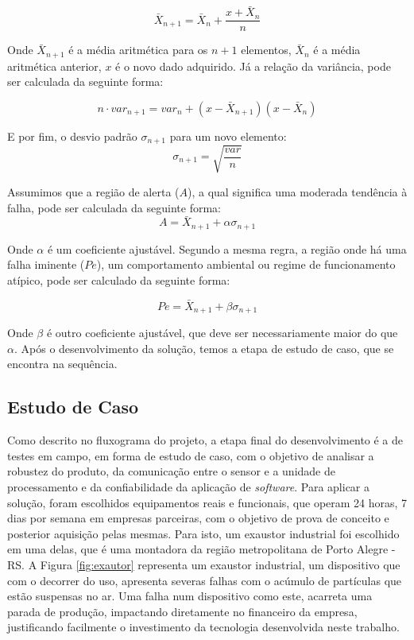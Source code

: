 \documentclass[a4paper]{ifacconf}
\begin{document}
\begin{equation}\label{eq:ml}
    \bar{X}_{n+1} = \bar{X}_{n} + \frac{x + \bar{X}_n}{n}
\end{equation}

Onde $\bar{X}_{n+1}$ é a média aritmética para os $n+1$ elementos, $ \bar{X}_{n}$ é a média aritmética anterior,
$x$ é o novo dado adquirido. Já a relação da variância, pode ser calculada da seguinte forma:


\begin{equation}\label{eq:ml2}
    n \cdot var_{n+1} = var_{n} + (x - \bar{X}_{n+1})(x-\bar{X}_n)
\end{equation}

E por fim, o desvio padrão $\sigma_{n+1}$ para um novo elemento:
\begin{equation}\label{eq:ml3}
    \sigma_{n+1} = \sqrt{\frac{var}{n}}
\end{equation}

Assumimos que a região de alerta ($A$), a qual significa uma moderada tendência à falha, pode ser calculada da seguinte forma: 
\begin{equation}\label{eq:ml4}
    A = \bar{X}_{n+1} + \alpha \sigma_{n+1} 
\end{equation}

Onde $\alpha$ é um coeficiente ajustável. Segundo a mesma regra, a região onde há uma falha iminente ($Pe$), um comportamento ambiental ou regime de funcionamento atípico, 
pode ser calculado da seguinte forma:

\begin{equation}\label{eq:ml5}
    Pe = \bar{X}_{n+1} + \beta \sigma_{n+1} 
\end{equation}

Onde $\beta$ é outro coeficiente ajustável, que deve ser necessariamente maior do que $\alpha$. Após o desenvolvimento
da solução, temos a etapa de estudo de caso, que se encontra na sequência.


\subsection{Estudo de Caso}

Como descrito no fluxograma do projeto, a etapa final do desenvolvimento é a de testes em campo, em forma de estudo de caso, com o objetivo 
de analisar a robustez do produto, da comunicação entre o sensor e a unidade de processamento e da confiabilidade da aplicação de \textit{software}. 
Para aplicar a solução, foram escolhidos equipamentos reais e funcionais, que operam 24 horas, 7 dias por semana em empresas parceiras,
com o objetivo de prova de conceito e posterior aquisição pelas mesmas. Para isto, um exaustor industrial foi escolhido em uma delas, que é 
uma montadora da região metropolitana de Porto Alegre - RS. A Figura \ref{fig:exautor} representa um exaustor industrial, um dispositivo que com
o decorrer do uso, apresenta severas falhas com o acúmulo de partículas que estão suspensas no ar. 
Uma falha num dispositivo como este, acarreta uma parada de  produção, impactando diretamente no financeiro da empresa, justificando 
facilmente o investimento da tecnologia desenvolvida neste trabalho.
\end{document}
